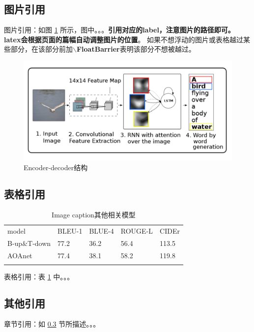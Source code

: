 \documentclass[UTF8,12pt]{article} %
\begin{document}
\subsection{图片引用}
图片引用：如图 \ref{fig:enc-dec} 所示，图中。。。\textbf{引用对应的label，注意图片的路径即可。}
\textbf{latex会根据页面的篇幅自动调整图片的位置}。
如果不想浮动的图片或表格越过某些部分，在该部分前加\textbf{$\backslash$FloatBarrier}表明该部分不想被越过。
\begin{figure}[ht]
  \centering
  \includegraphics[scale=1.2]{figs/pic.png}
  \caption{Encoder-decoder结构}
  \label{fig:enc-dec}
\end{figure}

\subsection{表格引用}
\begin{table}
  \centering
  \begin{tabular}{lllll}
    \hline
    \noalign{\smallskip}
    model & BLEU-1 & BLUE-4 & ROUGE-L & CIDEr  \\
    \noalign{\smallskip}
    \hline
    \noalign{\smallskip}
    B-up\&T-down & 77.2 & 36.2 & 56.4 & 113.5 \\
    AOAnet & 77.4 & 38.1 & 58.2 & 119.8 \\
    \noalign{\smallskip}
    \hline
  \end{tabular}
  \caption{Image caption其他相关模型}
  \label{tab:1}%
\end{table}
  表格引用：表 \ref{tab:1} 中。。。
\subsection{其他引用}\label{anchor-2-3}
  章节引用：如 \ref{anchor-2-3} 节所描述。。。
  
\end{document}
